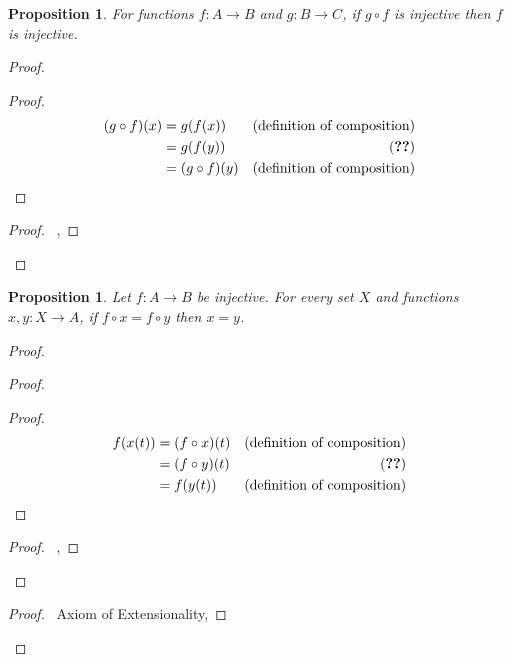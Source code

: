 \documentclass{book}
\let\qed\relax
\newtheorem{prop}[ax]{Proposition}
\theoremstyle{definition}
\begin{document}
\begin{prop}
For functions $f : A \rightarrow B$ and $g : B \rightarrow C$, if $g \circ f$ is injective then $f$ is injective.
\end{prop}

\begin{proof}
\pf
{}
\begin{proof}
	\pf
	\begin{align*}
		(g \circ f)(x) & = g(f(x)) & (\text{definition of composition}) \\
		& = g(f(y)) & (\text{\stepref{6}}) \\
		& = (g \circ f)(y) & (\text{definition of composition})
	\end{align*}
\end{proof}
\begin{proof}
	\pf\ , 
\end{proof}
\qed
\end{proof}

\begin{prop}
\label{prop:injective}
Let $f : A \rightarrow B$ be injective. For every set $X$ and functions $x,y : X \rightarrow A$, if $f \circ x = f \circ y$ then $x = y$.
\end{prop}

\begin{proof}
\pf
	\begin{proof}
		\begin{proof}
			\pf
			\begin{align*}
				f(x(t)) & = (f \circ x)(t) & (\text{definition of composition}) \\
				& = (f \circ y)(t) & (\text{\stepref{d}}) \\
				& = f(y(t)) & (\text{definition of composition})
			\end{align*}
		\end{proof}
		\begin{proof}
			\pf\ , 
		\end{proof}
	\end{proof}
	\begin{proof}
		\pf\ Axiom of Extensionality, 
	\end{proof}
\qed
\end{proof}
\end{document}
